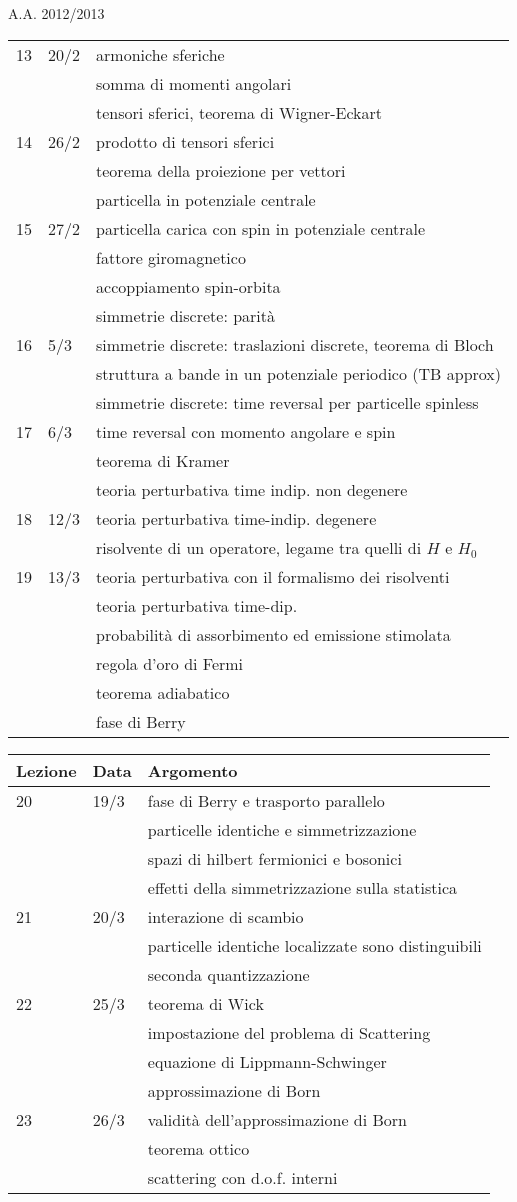 \documentclass[a4paper, 12pt]{article}
\newcommand{\nl}{\\ & & }
\newcommand{\nr}{\\ \midrule}
\begin{document}
\begin{section}{A.A. 2012/2013}
\begin{tabular}{lll}
13 & 20/2 & armoniche sferiche \nl somma di momenti angolari \nl tensori sferici, teorema di Wigner-Eckart \nr

14 & 26/2 & prodotto di tensori sferici \nl teorema della proiezione per vettori \nl particella in  potenziale centrale \nr

15 & 27/2 & particella carica con spin in potenziale centrale \nl fattore giromagnetico \nl accoppiamento spin-orbita \nl simmetrie discrete: parità \nr 

16 & 5/3 & simmetrie discrete: traslazioni discrete, teorema di Bloch \nl struttura a bande in un potenziale periodico (TB approx) \nl simmetrie discrete: time reversal per particelle spinless  \nr 

17 & 6/3 & time reversal con momento angolare e spin \nl teorema di Kramer \nl teoria perturbativa time indip. non degenere\nr 

18 & 12/3 & teoria perturbativa time-indip. degenere \nl risolvente di un operatore, legame tra quelli di $H$ e $H_0$\nr

19 & 13/3 & teoria perturbativa con il formalismo dei risolventi \nl teoria perturbativa time-dip. \nl probabilità di assorbimento ed emissione stimolata \nl regola d'oro di Fermi \nl teorema adiabatico \nl fase di Berry \nr 

\end{tabular}

\begin{tabular}{lll}
Lezione & Data & Argomento\nr

20 & 19/3 & fase di Berry e trasporto parallelo \nl particelle identiche e simmetrizzazione \nl spazi di hilbert fermionici e bosonici \nl effetti della simmetrizzazione sulla statistica \nr 

21 & 20/3 & interazione di scambio \nl particelle identiche localizzate sono distinguibili \nl seconda quantizzazione \nr 

22 & 25/3 & teorema di Wick \nl impostazione del problema di Scattering \nl equazione di Lippmann-Schwinger \nl approssimazione di Born \nr

23 & 26/3 & validità dell'approssimazione di Born \nl teorema ottico \nl scattering con d.o.f. interni \nr
\bottomrule
\end{tabular}

\end{section}
\end{document}
